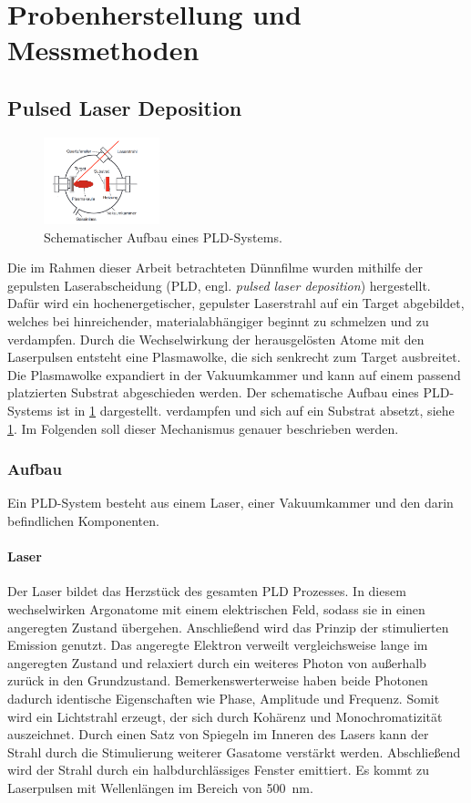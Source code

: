 \section{Probenherstellung und Messmethoden}\label{sec:messmethoden}

\subsection{Pulsed Laser Deposition}\label{subsec:pld}
\begin{figure}
    \centering
    \includegraphics[width=0.3\textwidth]{../assets/messmethoden/pld/aufbau}
    \caption{Schematischer Aufbau eines PLD-Systems.}
    \label{fig:pld}
\end{figure}
Die im Rahmen dieser Arbeit betrachteten Dünnfilme wurden mithilfe der gepulsten Laserabscheidung
(PLD, engl. \textit{pulsed laser deposition}) hergestellt.
Dafür wird ein hochenergetischer, gepulster Laserstrahl auf ein Target abgebildet, welches bei hinreichender,
materialabhängiger beginnt zu schmelzen und zu verdampfen.
Durch die Wechselwirkung der herausgelösten Atome mit den Laserpulsen entsteht eine Plasmawolke, die sich senkrecht
zum Target ausbreitet.
Die Plasmawolke expandiert in der Vakuumkammer und kann auf einem passend platzierten Substrat abgeschieden werden.
Der schematische Aufbau eines PLD-Systems ist in \cref{fig:pld} dargestellt.
verdampfen und sich auf ein Substrat absetzt, siehe \cref{fig:pld}.
Im Folgenden soll dieser Mechanismus genauer beschrieben werden.

\subsubsection{Aufbau}
Ein PLD-System besteht aus einem Laser, einer Vakuumkammer und den darin befindlichen Komponenten.

\paragraph{Laser}
Der Laser bildet das Herzstück des gesamten PLD Prozesses.
In diesem wechselwirken Argonatome mit einem elektrischen Feld, sodass sie in einen angeregten Zustand übergehen.
Anschließend wird das Prinzip der stimulierten Emission genutzt.
Das angeregte Elektron verweilt vergleichsweise lange im angeregten Zustand und relaxiert durch ein
weiteres Photon von außerhalb zurück in den Grundzustand.
Bemerkenswerterweise haben beide Photonen dadurch identische Eigenschaften wie Phase, Amplitude und Frequenz.
Somit wird ein Lichtstrahl erzeugt, der sich durch Kohärenz und Monochromatizität auszeichnet.
Durch einen Satz von Spiegeln im Inneren des Lasers kann der Strahl durch die Stimulierung weiterer Gasatome
verstärkt werden.
Abschließend wird der Strahl durch ein halbdurchlässiges Fenster emittiert. \autocite[2296-2297]{pld}
Es kommt zu Laserpulsen mit Wellenlängen im Bereich von \qty{500}{\nano\meter}.

